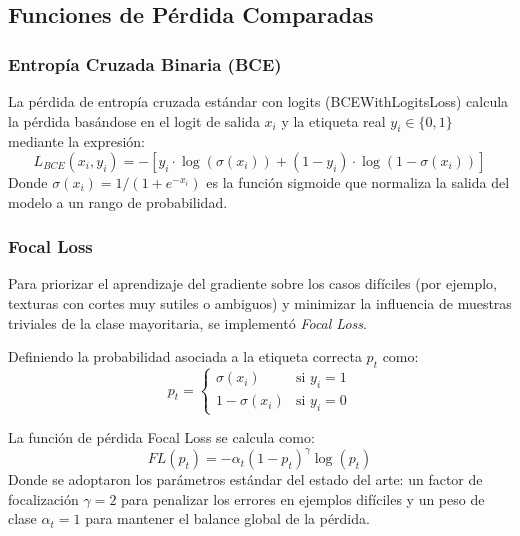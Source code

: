 \subsection{Funciones de Pérdida Comparadas}

\subsubsection{Entropía Cruzada Binaria (BCE)}
La pérdida de entropía cruzada estándar con logits (BCEWithLogitsLoss) calcula la pérdida basándose en el logit de salida $x_i$ y la etiqueta real $y_i \in \{0, 1\}$ mediante la expresión:
\begin{equation}
L_{BCE}(x_i, y_i) = - [y_i \cdot \log(\sigma(x_i)) + (1 - y_i) \cdot \log(1 - \sigma(x_i))]
\end{equation}
Donde $\sigma(x_i) = 1 / (1 + e^{-x_i})$ es la función sigmoide que normaliza la salida del modelo a un rango de probabilidad.

\subsubsection{Focal Loss}
Para priorizar el aprendizaje del gradiente sobre los casos difíciles (por ejemplo, texturas con cortes muy sutiles o ambiguos) y minimizar la influencia de muestras triviales de la clase mayoritaria, se implementó \textit{Focal Loss}.

Definiendo la probabilidad asociada a la etiqueta correcta $p_t$ como:
\begin{equation}
p_t = \begin{cases} 
      \sigma(x_i) & \text{si } y_i = 1 \\
      1 - \sigma(x_i) & \text{si } y_i = 0 
   \end{cases}
\end{equation}

La función de pérdida Focal Loss se calcula como:
\begin{equation}
FL(p_t) = -\alpha_t (1 - p_t)^\gamma \log(p_t)
\end{equation}
Donde se adoptaron los parámetros estándar del estado del arte: un factor de focalización $\gamma = 2$ para penalizar los errores en ejemplos difíciles y un peso de clase $\alpha_t = 1$ para mantener el balance global de la pérdida.
